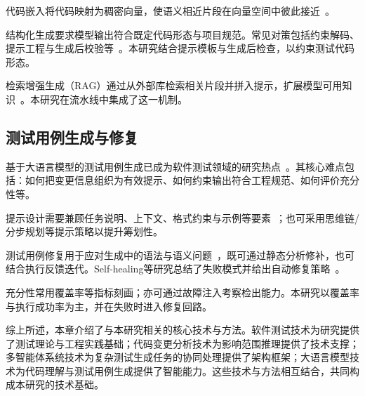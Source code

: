 代码嵌入将代码映射为稠密向量，使语义相近片段在向量空间中彼此接近~\cite{Alon2019Code2Vec}。

结构化生成要求模型输出符合既定代码形态与项目规范。常见对策包括约束解码、提示工程与生成后校验等~\cite{Geng2023ConstrainedDecoding,Bommasani2021FoundationModels}。本研究结合提示模板与生成后检查，以约束测试代码形态。

检索增强生成（RAG）通过从外部库检索相关片段并拼入提示，扩展模型可用知识~\cite{Lewis2020RAG}。本研究在流水线中集成了这一机制。

\subsection{测试用例生成与修复}
基于大语言模型的测试用例生成已成为软件测试领域的研究热点~\cite{Tufano2021UnitTest}。其核心难点包括：如何把变更信息组织为有效提示、如何约束输出符合工程规范、如何评价充分性等。

提示设计需要兼顾任务说明、上下文、格式约束与示例等要素~\cite{Brown2020GPT3}；也可采用思维链/分步规划等提示策略以提升筹划性。

测试用例修复用于应对生成中的语法与语义问题~\cite{Xia2023TestRepair}，既可通过静态分析修补，也可结合执行反馈迭代。Self-healing等研究总结了失败模式并给出自动修复策略~\cite{Yin2021SelfHealingTest}。

充分性常用覆盖率等指标刻画；亦可通过故障注入考察检出能力。本研究以覆盖率与执行成功率为主，并在失败时进入修复回路。

综上所述，本章介绍了与本研究相关的核心技术与方法。软件测试技术为研究提供了测试理论与工程实践基础；代码变更分析技术为影响范围推理提供了技术支撑；多智能体系统技术为复杂测试生成任务的协同处理提供了架构框架；大语言模型技术为代码理解与测试用例生成提供了智能能力。这些技术与方法相互结合，共同构成本研究的技术基础。
